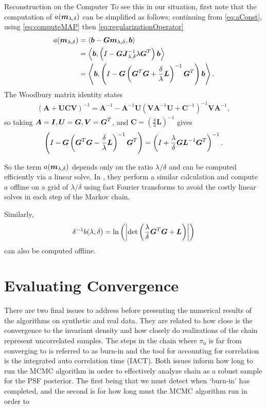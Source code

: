 \begin{chapter}{Reconstruction on the Computer}
To see this in our situation, first note that the computation of $a(\mbox{\boldmath$m$}_{\lambda,\delta})$ can be simplified as follows; continuing from \eqref{eq:aConst}, using \eqref{eq:computeMAP} then \eqref{eq:regularizationOperator}
\begin{align}
  a(\mbox{\boldmath$m$}_{\lambda,\delta}) 
    &= \left\langle\mbox{\boldmath$b$} - \mbox{\boldmath$G$}\mbox{\boldmath$m$}_{\lambda,\delta},\mbox{\boldmath$b$}\right\rangle\nonumber\\
    &=  \left\langle\mbox{\boldmath$b$},\left(I - \mbox{\boldmath$G$}  \mbox{\boldmath$J$}_{\lambda,\delta}^{-1}\lambda\mbox{\boldmath$G$}^T\right) \mbox{\boldmath$b$}\right\rangle\nonumber\\
    &= \left\langle \mbox{\boldmath$b$},\left( I - \mbox{\boldmath$G$}  \left( \mbox{\boldmath$G$}^T\mbox{\boldmath$G$} + \frac{\delta}{\lambda}\mbox{\boldmath$L$} \right)^{-1}\mbox{\boldmath$G$}^T \right)\mbox{\boldmath$b$} \right\rangle. 
\end{align}
The Woodbury matrix identity \citep{woodbury1950inverting} states
\begin{align}
  (\bm A + \bm U\bm C\bm V)^{-1} = \bm A^{-1} - \bm A^{-1}\bm U\left(\bm V\bm A^{-1}\bm U + \bm C^{-1}\right)^{-1}\bm V\bm A^{-1},
\end{align}
so taking $\mbox{\boldmath$A$} = \mbox{\boldmath$I$},\mbox{\boldmath$U$}=\mbox{\boldmath$G$}, \mbox{\boldmath$V$}=\mbox{\boldmath$G$}^T$, and $\bm C= \left(\frac\delta \lambda\bm L\right)^{-1}$ gives
\begin{equation}
  \left(I - \mbox{\boldmath$G$}  \left(\mbox{\boldmath$G$}^T\mbox{\boldmath$G$} - \frac{\delta}{\lambda}\mbox{\boldmath$L$}\right)^{-1}\mbox{\boldmath$G$}^T\right)
  = \left(I + \frac \lambda\delta \mbox{\boldmath$G$}\mbox{\boldmath$L$}^{-1}\mbox{\boldmath$G$}^T\right)^{-1}.
\end{equation}

So the term $a(\mbox{\boldmath$m$}_{\lambda,\delta})$ depends only on the ratio $\lambda/\delta$ and can be computed efficiently via a linear solve.
In \citep{fox2015fast}, they perform a similar calculation and compute $a$ offline on a grid of $\lambda/\delta$ using fast Fourier transforms to avoid the costly linear solves in each step of the Markov chain.

Similarly, 
\begin{equation}
  \delta^{-1}b(\lambda,\delta) = \ln\left(\left|\det\left(\frac \lambda\delta \mbox{\boldmath$G$}^T\mbox{\boldmath$G$} + \mbox{\boldmath$L$}\right)\right|\right)
\end{equation}
can also be computed offline.  

\section{Evaluating Convergence} \label{sec:evaluatingConvergence}

There are two final issues to address before presenting the numerical results of the algorithms on synthetic and real data.
They are related to how close is the convergence to the invariant density and how closely do realizations of the chain represent uncorrelated samples.
The steps in the chain where $\pi_0$ is far from converging to is referred to as burn-in and the tool for accounting for correlation is the integrated auto correlation time (IACT).
Both issues inform how long to run the MCMC algorithm in order to effectively analyze chain as a robust sample for the PSF posterior.
The first being that we must detect when `burn-in' has completed, and the second is for how long must the MCMC algorithm run in order to 


\end{chapter}

